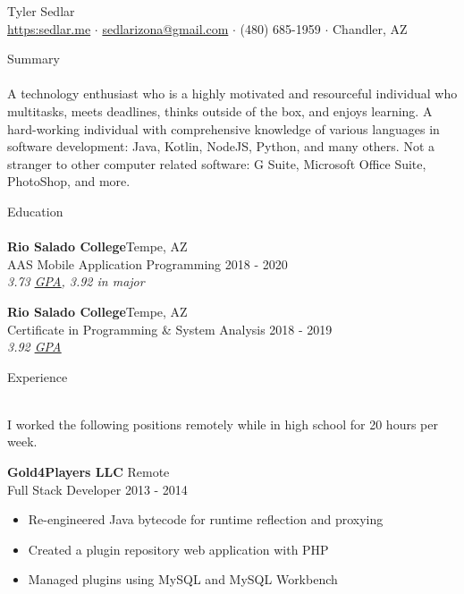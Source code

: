 \documentclass[a4paper]{article}
\newcommand{\lineunder} {
    \vspace*{-8pt} \\
    \hspace*{-18pt} \hrulefill \\
}
\newcommand{\header} [1] {
    {\hspace*{-18pt}\vspace*{6pt} {#1}}
    \vspace*{-6pt} \lineunder
}
\newcommand{\textslash}{/}
\begin{document}
\vspace*{-40pt}
\setul{}{0.25pt}

\vspace*{-10pt}
\begin{center}
	{\Huge {Tyler Sedlar}}\\
	\href{https://sedlar.me/}{https:\raisebox{1.1pt}{\textsc{\textbf{\textslash \textslash}}}sedlar.me} $\cdot$ \href{mailto:sedlarizona@gmail.com}{sedlarizona@gmail.com} $\cdot$ (480) 685-1959 $\cdot$ Chandler, AZ\\
\end{center}

\header{Summary}
A technology enthusiast who is a highly motivated and resourceful individual who multitasks, meets deadlines, thinks outside of the box, and enjoys learning.
A hard-working individual with comprehensive knowledge of various languages in software development: Java, Kotlin, NodeJS, Python, and many others.
Not a stranger to other computer related software: G Suite, Microsoft Office Suite, PhotoShop, and more.
\vspace{2mm}

\header{Education}
\textbf{Rio Salado College}\hfill Tempe, AZ\\
AAS Mobile Application Programming \hfill 2018 - 2020\\
\textit{3.73 \href{https://docs.google.com/spreadsheets/d/143DmVdsyjRVbH1ftcySxflvuNjioncAvJpj0vFbzpA8/edit?usp=sharing}{\ul{GPA}}, 3.92 in major}\\

\vspace{2mm}

\textbf{Rio Salado College}\hfill Tempe, AZ\\
Certificate in Programming \& System Analysis \hfill 2018 - 2019\\
\textit{3.92 \href{https://docs.google.com/spreadsheets/d/143DmVdsyjRVbH1ftcySxflvuNjioncAvJpj0vFbzpA8/edit?usp=sharing}{\ul{GPA}}}\\
\vspace{2mm}

\header{Experience}
\vspace{1mm}

I worked the following positions remotely while in high school for 20 hours per week.

\vspace{1mm}

\textbf{Gold4Players LLC} \hfill Remote\\
Full Stack Developer \hfill 2013 - 2014\\
\vspace{-3mm}
\begin{itemize} \itemsep 1pt
	\item Re-engineered Java bytecode for runtime reflection and proxying
	\vspace{-1mm}
	\item Created a plugin repository web application with PHP
	\vspace{-1mm}
	\item Managed plugins using MySQL and MySQL Workbench
\end{itemize}
\end{document}
